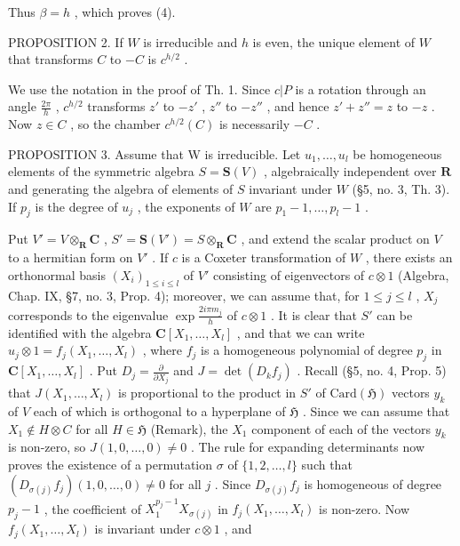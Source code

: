 Thus \(\beta = h\) , which proves (4).

PROPOSITION 2. If \(W\) is irreducible and \(h\) is even, the unique element of \(W\) that transforms \(C\) to \(-C\) is \(c^{h/2}\) .

We use the notation in the proof of Th. 1. Since \(c|P\) is a rotation through an angle \(\frac{2\pi}{h}\) , \(c^{h/2}\) transforms \(z'\) to \(-z'\) , \(z''\) to \(-z''\) , and hence \(z' + z'' = z\) to \(-z\) . Now \(z \in C\) , so the chamber \(c^{h/2}(C)\) is necessarily \(-C\) .

PROPOSITION 3. Assume that W is irreducible. Let \(u_1, \ldots, u_l\) be homogeneous elements of the symmetric algebra \(S = \mathbf{S}(V)\) , algebraically independent over \(\mathbf{R}\) and generating the algebra of elements of \(S\) invariant under \(W\) (§5, no. 3, Th. 3). If \(p_j\) is the degree of \(u_j\) , the exponents of \(W\) are \(p_1 - 1, \ldots, p_l - 1\) .

Put \(V' = V \otimes_{\mathbf{R}} \mathbf{C}\) , \(S' = \mathbf{S}(V') = S \otimes_{\mathbf{R}} \mathbf{C}\) , and extend the scalar product on \(V\) to a hermitian form on \(V'\) . If \(c\) is a Coxeter transformation of \(W\) , there exists an orthonormal basis \((X_i)_{1 \leqslant i \leqslant l}\) of \(V'\) consisting of eigenvectors of \(c \otimes 1\) (Algebra, Chap. IX, §7, no. 3, Prop. 4); moreover, we can assume that, for \(1 \leqslant j \leqslant l\) , \(X_j\) corresponds to the eigenvalue \(\exp \frac{2i\pi m_j}{h}\) of \(c \otimes 1\) . It is clear that \(S'\) can be identified with the algebra \(\mathbf{C}[X_1, \ldots, X_l]\) , and that we can write \(u_j \otimes 1 = f_j(X_1, \ldots, X_l)\) , where \(f_j\) is a homogeneous polynomial of degree \(p_j\) in \(\mathbf{C}[X_1, \ldots, X_l]\) . Put \(D_j = \frac{\partial}{\partial X_j}\) and \(J = \det(D_k f_j)\) . Recall (§5, no. 4, Prop. 5) that \(J(X_1, \ldots, X_l)\) is proportional to the product in \(S'\) of \(\text{Card}(\mathfrak{H})\) vectors \(y_k\) of \(V\) each of which is orthogonal to a hyperplane of \(\mathfrak{H}\) . Since we can assume that \(X_1 \notin H \otimes C\) for all \(H \in \mathfrak{H}\) (Remark), the \(X_1\) component of each of the vectors \(y_k\) is non-zero, so \(J(1, 0, \ldots, 0) \neq 0\) . The rule for expanding determinants now proves the existence of a permutation \(\sigma\) of \(\{1, 2, \ldots, l\}\) such that \((D_{\sigma(j)} f_j)(1, 0, \ldots, 0) \neq 0\) for all \(j\) . Since \(D_{\sigma(j)} f_j\) is homogeneous of degree \(p_j - 1\) , the coefficient of \(X_1^{p_j - 1} X_{\sigma(j)}\) in \(f_j(X_1, \ldots, X_l)\) is non-zero. Now \(f_j(X_1, \ldots, X_l)\) is invariant under \(c \otimes 1\) , and

